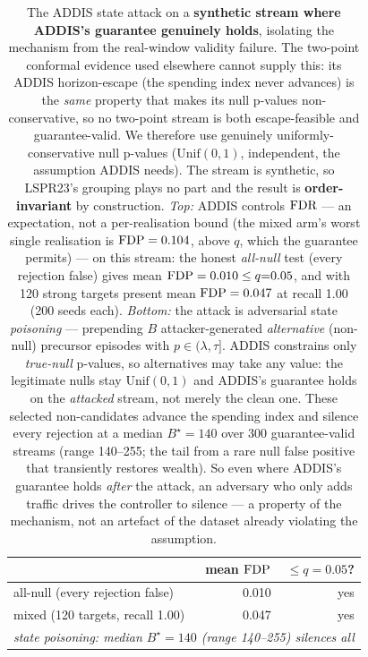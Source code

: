 \begin{table}[t]
\centering
\caption{The ADDIS state attack on a \textbf{synthetic stream where ADDIS's guarantee genuinely
holds}, isolating the mechanism from the real-window validity failure. The two-point conformal
evidence used elsewhere cannot supply this: its ADDIS horizon-escape (the spending index never
advances) is the \emph{same} property that makes its null p-values non-conservative, so no two-point
stream is both escape-feasible and guarantee-valid. We therefore use genuinely uniformly-conservative
null p-values ($\mathrm{Unif}(0,1)$, independent, the assumption ADDIS needs). The stream is
synthetic, so LSPR23's grouping plays no part and the result is \textbf{order-invariant} by
construction. \emph{Top:} ADDIS
controls $\mathrm{FDR}$ --- an expectation, not a per-realisation bound (the mixed arm's worst single
realisation is $\mathrm{FDP}=0.104$, above $q$, which the guarantee permits) --- on this
stream: the honest \emph{all-null} test (every rejection false) gives mean $\mathrm{FDP}=0.010\le q{=}0.05$, and with 120
strong targets present mean $\mathrm{FDP}=0.047$ at recall
1.00 (200 seeds each). \emph{Bottom:} the attack is adversarial state \emph{poisoning} ---
prepending $B$ attacker-generated \emph{alternative} (non-null) precursor episodes with
$p\in(\lambda,\tau]$. ADDIS constrains only \emph{true-null} p-values, so alternatives may take any
value: the legitimate nulls stay $\mathrm{Unif}(0,1)$ and ADDIS's guarantee holds on the \emph{attacked}
stream, not merely the clean one. These selected non-candidates advance the spending index and silence
every rejection at a median $B^{\star}=140$ over 300 guarantee-valid streams
(range 140--255; the tail from a rare null false positive that transiently
restores wealth). So even where ADDIS's guarantee holds \emph{after} the attack, an adversary who only
adds traffic drives the controller to silence --- a property of the mechanism, not an artefact of the
dataset already violating the assumption.}
\label{apptab:addissynth}
\begin{tabular}{lrr}
\toprule
 & mean $\mathrm{FDP}$ & $\le q{=}0.05$? \\
\midrule
all-null (every rejection false) & 0.010 & yes \\
mixed (120 targets, recall 1.00) & 0.047 & yes \\
\midrule
\multicolumn{3}{l}{\emph{state poisoning: median $B^{\star}{=}140$ (range 140--255) silences all}} \\
\bottomrule
\end{tabular}
\end{table}
